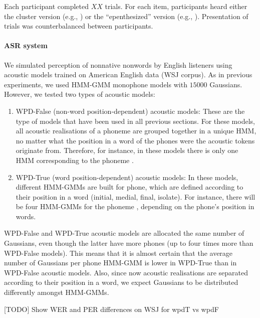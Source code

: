 {Each participant completed {\color{red}$XX$} trials. For each item, participants heard either the cluster version (e.g., ) or the ``epenthesized'' version (e.g., ). Presentation of trials was counterbalanced between participants.   


\paragraph{ASR system}
We simulated perception of nonnative nonwords by English listeners using acoustic models trained on American English data (WSJ corpus). As in previous experiments, we used HMM-GMM monophone models with $15000$ Gaussians. However, we tested two types of acoustic models:

\begin{enumerate}
\item WPD-False (non-word position-dependent) acoustic models: These are the type of models that have been used in all previous sections. For these models, all acoustic realisations of a phoneme are grouped together in a unique HMM, no matter what the position in a word of the phones were the acoustic tokens originate from. Therefore, for instance, in these models there is only one HMM corresponding to the phoneme .
  \item WPD-True (word position-dependent) acoustic models: In these models, different HMM-GMMs are built for phone, which are defined according to their position in a word (initial, medial, final, isolate). For instance, there will be four HMM-GMMs for the phoneme , depending on the phone's position in words.  
\end{enumerate}

WPD-False and WPD-True acoustic models are allocated the same number of Gaussians, even though the latter have more phones (up to four times more than WPD-False models). This means that it is almost certain that the average number of Gaussians per phone HMM-GMM is lower in WPD-True than in WPD-False acoustic models. Also, since now acoustic realisations are separated according to their position in a word, we expect Gaussians to be distributed differently amongst HMM-GMMs.

{\color{red}[TODO] Show WER and PER differences on WSJ for wpdT vs wpdF}

}

